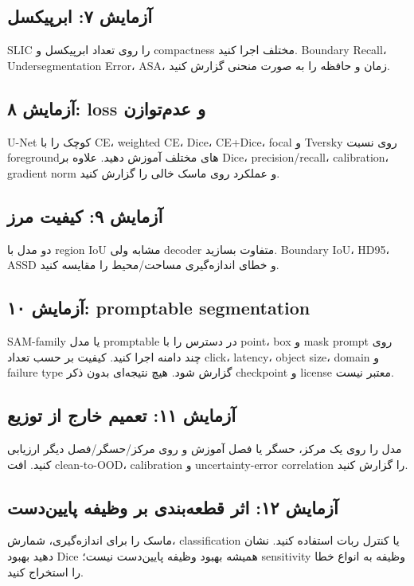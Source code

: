 \documentclass[12pt,openany,oneside]{book}
\begin{document}
\subsection{آزمایش ۷: ابرپیکسل}
SLIC را روی تعداد ابرپیکسل و compactness مختلف اجرا کنید. Boundary Recall، Undersegmentation Error، ASA، زمان و
حافظه را به صورت منحنی گزارش کنید.

\subsection{آزمایش ۸: loss و عدم‌توازن}
U-Net کوچک را با CE، weighted CE، Dice، CE+Dice، focal و Tversky روی نسبت foregroundهای مختلف آموزش دهید. علاوه
بر Dice، precision/recall، calibration، gradient norm و عملکرد روی ماسک خالی را گزارش کنید.

\subsection{آزمایش ۹: کیفیت مرز}
دو مدل با region IoU مشابه ولی decoder متفاوت بسازید. Boundary IoU، HD95، ASSD و خطای اندازه‌گیری مساحت/محیط را
مقایسه کنید.

\subsection{آزمایش ۱۰: promptable segmentation}
SAM-family یا مدل promptable در دسترس را با point، box و mask prompt روی چند دامنه اجرا کنید. کیفیت بر حسب تعداد
click، latency، object size، domain و failure type گزارش شود. هیچ نتیجه‌ای بدون ذکر checkpoint و license معتبر نیست.

\subsection{آزمایش ۱۱: تعمیم خارج از توزیع}
مدل را روی یک مرکز، حسگر یا فصل آموزش و روی مرکز/حسگر/فصل دیگر ارزیابی کنید. افت clean-to-OOD، calibration و
uncertainty-error correlation را گزارش کنید.

\subsection{آزمایش ۱۲: اثر قطعه‌بندی بر وظیفه پایین‌دست}
ماسک را برای اندازه‌گیری، شمارش، classification یا کنترل ربات استفاده کنید. نشان دهید بهبود Dice همیشه بهبود وظیفه
پایین‌دست نیست؛ sensitivity وظیفه به انواع خطا را استخراج کنید.
\end{document}
